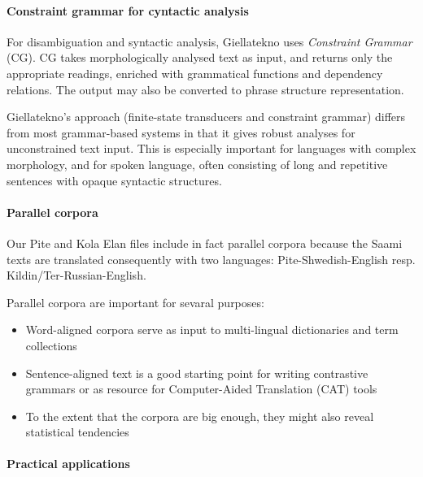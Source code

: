 \documentclass[a4paper,12pt]{article}
\begin{document}
\paragraph{Constraint grammar for cyntactic analysis}

For disambiguation and syntactic analysis, Giellatekno uses \textit{Constraint Grammar} (CG). CG takes morphologically analysed text as input, and returns only the appropriate readings, enriched with grammatical functions and dependency relations. The output may also be converted to phrase structure representation.

Giellatekno's approach (finite-state transducers and constraint grammar) differs from most grammar-based systems in that it gives robust analyses for unconstrained text input. This is especially important for languages with complex morphology, and for spoken language, often consisting of long and repetitive sentences with opaque syntactic structures.


\paragraph{Parallel corpora}
Our Pite and Kola Elan files include in fact parallel corpora because the Saami texts are translated consequently with two languages: Pite-Shwedish-English resp. Kildin/Ter-Russian-English.%

Parallel corpora are important for sevaral purposes:

\begin{itemize}
\item Word-aligned corpora serve as input to multi-lingual dictionaries and term collections
\item Sentence-aligned text is a good starting point for writing contrastive grammars or as resource for
Computer-Aided Translation (CAT) tools 
\item To the extent that the corpora are big enough, they might also reveal statistical tendencies
\end{itemize}



\paragraph{Practical applications}
\end{document}
